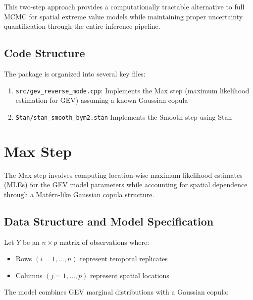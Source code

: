 \documentclass[
  letterpaper,
  DIV=11,
  numbers=noendperiod]{scrartcl}
\providecommand{\tightlist}{%
  \setlength{\itemsep}{0pt}\setlength{\parskip}{0pt}}\usepackage{longtable,booktabs,array}
\begin{document}
This two-step approach provides a computationally tractable alternative
to full MCMC for spatial extreme value models while maintaining proper
uncertainty quantification through the entire inference pipeline.

\subsection{Code Structure}\label{code-structure}

The package is organized into several key files:

\begin{enumerate}
\def\labelenumi{\arabic{enumi}.}
\tightlist
\item
  \texttt{src/gev\_reverse\_mode.cpp}: Implements the Max step (maximum
  likelihood estimation for GEV) assuming a known Gaussian copula
\item
  \texttt{Stan/stan\_smooth\_bym2.stan} Implements the Smooth step using
  Stan
\end{enumerate}

\section{Max Step}\label{max-step}

The Max step involves computing location-wise maximum likelihood
estimates (MLEs) for the GEV model parameters while accounting for
spatial dependence through a Matérn-like Gaussian copula structure.

\subsection{Data Structure and Model
Specification}\label{data-structure-and-model-specification}

Let \(Y\) be an \(n \times p\) matrix of observations where:

\begin{itemize}
\tightlist
\item
  Rows \((i=1,\ldots,n)\) represent temporal replicates
\item
  Columns \((j=1,\ldots,p)\) represent spatial locations
\end{itemize}

The model combines GEV marginal distributions with a Gaussian copula:
\end{document}
